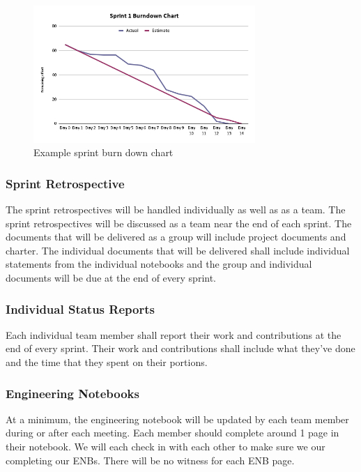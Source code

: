 \begin{figure}[h!]
    \centering
    \includegraphics[width=0.75\textwidth]{project charter latex/images/sprint01-burndown-chart.png}
    \caption{Example sprint burn down chart}
\end{figure}

\subsubsection{Sprint Retrospective}
The sprint retrospectives will be handled individually as well as as a team. The sprint retrospectives will be discussed as a team near the end of each sprint. The documents that will be delivered as a group will include project documents and charter. The individual documents that will be delivered shall include individual statements from the individual notebooks and the group and individual documents will be due at the end of every sprint.

\subsubsection{Individual Status Reports}
Each individual team member shall report their work and contributions at the end of every sprint. Their work and contributions shall include what they've done and the time that they spent on their portions. 

\subsubsection{Engineering Notebooks}
At a minimum, the engineering notebook will be updated by each team member during or after each meeting. Each member should complete around 1 page in their notebook. We will each check in with each other to make sure we our completing our ENBs. There will be no witness for each ENB page.

